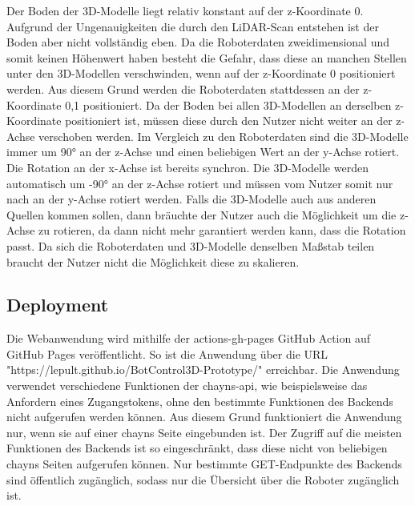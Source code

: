 Der Boden der 3D-Modelle liegt relativ konstant auf der z-Koordinate 0. Aufgrund der Ungenauigkeiten die durch den \ac{LiDAR}-Scan entstehen ist der Boden aber nicht vollständig eben. Da die Roboterdaten zweidimensional und somit keinen Höhenwert haben besteht die Gefahr, dass diese an manchen Stellen unter den 3D-Modellen verschwinden, wenn auf der z-Koordinate 0 positioniert werden. Aus diesem Grund werden die Roboterdaten stattdessen an der z-Koordinate 0,1 positioniert. Da der Boden bei allen 3D-Modellen an derselben z-Koordinate positioniert ist, müssen diese durch den Nutzer nicht weiter an der z-Achse verschoben werden. Im Vergleich zu den Roboterdaten sind die 3D-Modelle immer um 90° an der z-Achse und einen beliebigen Wert an der y-Achse rotiert. Die Rotation an der x-Achse ist bereits synchron. Die 3D-Modelle werden automatisch um -90° an der z-Achse rotiert und müssen vom Nutzer somit nur nach an der y-Achse rotiert werden. Falls die 3D-Modelle auch aus anderen Quellen kommen sollen, dann bräuchte der Nutzer auch die Möglichkeit um die z-Achse zu rotieren, da dann nicht mehr garantiert werden kann, dass die Rotation passt. Da sich die Roboterdaten und 3D-Modelle denselben Maßstab teilen braucht der Nutzer nicht die Möglichkeit diese zu skalieren.


\subsection{Deployment}

Die Webanwendung wird mithilfe der actions-gh-pages GitHub Action auf GitHub Pages veröffentlicht. So ist die Anwendung über die \ac{URL} "https://lepult.github.io/BotControl3D-Prototype/" erreichbar. Die Anwendung verwendet verschiedene Funktionen der chayns-api, wie beispielsweise das Anfordern eines Zugangstokens, ohne den bestimmte Funktionen des Backends nicht aufgerufen werden können. Aus diesem Grund funktioniert die Anwendung nur, wenn sie auf einer chayns Seite eingebunden ist. Der Zugriff auf die meisten Funktionen des Backends ist so eingeschränkt, dass diese nicht von beliebigen chayns Seiten aufgerufen können. Nur bestimmte GET-Endpunkte des Backends sind öffentlich zugänglich, sodass nur die Übersicht über die Roboter zugänglich ist.


